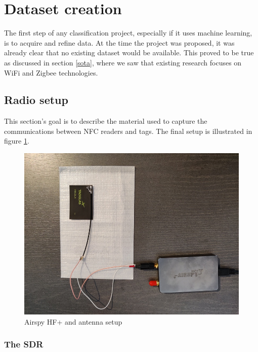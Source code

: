 \section{Dataset creation}

The first step of any classification project, especially if it uses machine learning, is to acquire and refine data. At the time the project was proposed, it was already clear that no existing dataset would be available. This proved to be true as discussed in section \ref{sota}, where we saw that existing research focuses on WiFi and Zigbee technologies.

\subsection{Radio setup}

This section's goal is to describe the material used to capture the communications between NFC readers and tags. The final setup is illustrated in figure \ref{fig:radio-setup}.

\begin{figure}[htbp!]
  \centering
  \includegraphics[scale=0.35]{figures/data_sdr-setup2.jpg}
  \caption{Airspy HF+ and antenna setup}
  \label{fig:radio-setup}
\end{figure}

\subsubsection{The SDR}

